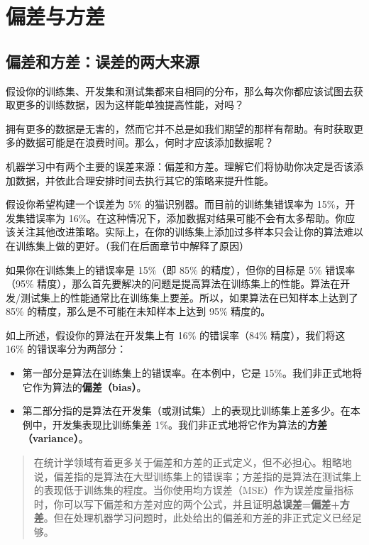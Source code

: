 \hypertarget{ux504fux5deeux4e0eux65b9ux5dee}{%
\part{偏差与方差}\label{ux504fux5deeux4e0eux65b9ux5dee}}

\hypertarget{ux504fux5deeux548cux65b9ux5deeux8befux5deeux7684ux4e24ux5927ux6765ux6e90}{%
\chapter{偏差和方差：误差的两大来源}\label{ux504fux5deeux548cux65b9ux5deeux8befux5deeux7684ux4e24ux5927ux6765ux6e90}}

假设你的训练集、开发集和测试集都来自相同的分布，那么每次你都应该试图去获取更多的训练数据，因为这样能单独提高性能，对吗？

拥有更多的数据是无害的，然而它并不总是如我们期望的那样有帮助。有时获取更多的数据可能是在浪费时间。那么，何时才应该添加数据呢？

机器学习中有两个主要的误差来源：偏差和方差。理解它们将协助你决定是否该添加数据，并依此合理安排时间去执行其它的策略来提升性能。

假设你希望构建一个误差为 5\% 的猫识别器。而目前的训练集错误率为
15\%，开发集错误率为
16\%。在这种情况下，添加数据对结果可能不会有太多帮助。你应该关注其他改进策略。实际上，在你的训练集上添加过多样本只会让你的算法难以在训练集上做的更好。（我们在后面章节中解释了原因）

如果你在训练集上的错误率是 15\%（即 85\% 的精度），但你的目标是 5\%
错误率（95\%
精度），那么首先要解决的问题是提高算法在训练集上的性能。算法在开发/测试集上的性能通常比在训练集上要差。所以，如果算法在已知样本上达到了
85\% 的精度，那么是不可能在未知样本上达到 95\% 精度的。

如上所述，假设你的算法在开发集上有 16\% 的错误率（84\% 精度），我们将这
16\% 的错误率分为两部分：

\begin{itemize}
\tightlist
\item
  第一部分是算法在训练集上的错误率。在本例中，它是
  15\%。我们非正式地将它作为算法的\textbf{偏差（bias）}。
\item
  第二部分指的是算法在开发集（或测试集）上的表现比训练集上差多少。在本例中，开发集表现比训练集差
  1\%。我们非正式地将它作为算法的\textbf{方差（variance）}。
\end{itemize}

\begin{quote}
在统计学领域有着更多关于偏差和方差的正式定义，但不必担心。粗略地说，偏差指的是算法在大型训练集上的错误率；方差指的是算法在测试集上的表现低于训练集的程度。当你使用均方误差（MSE）作为误差度量指标时，你可以写下偏差和方差对应的两个公式，并且证明\textbf{总误差=偏差+方差}。但在处理机器学习问题时，此处给出的偏差和方差的非正式定义已经足够。
\end{quote}

